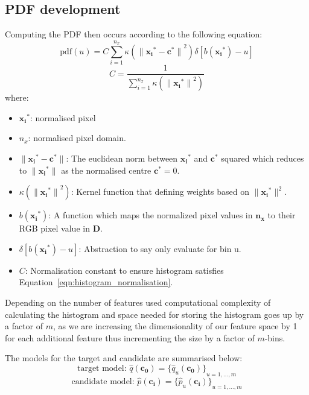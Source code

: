 \subsection{PDF development}
Computing the PDF then occurs according to the following equation:
\begin{equation}\label{eqn:mean_shift_histogram}
    \text{pdf}(u)=C\sum_{i=1}^{n_x}\kappa({\parallel{\mathbf{x_i}^*}-{\mathbf{c}^*}\parallel}^2)\delta[b(\mathbf{x_i}^*)-u]    
\end{equation}
\begin{equation}\label{eqn:histogram_normalisation}
    C=\frac{1}{\sum_{i=1}^{n_x}\kappa({\parallel\mathbf{x_i}^*\parallel}^2)}
\end{equation}
where:
\begin{itemize}
    \item $\mathbf{x_i}^*$: normalised pixel 
    \item $n_x$: normalised pixel domain.
    \item $\parallel{\mathbf{x_i}}^*-{\mathbf{c}}^*\parallel$: The euclidean
        norm between $\mathbf{x_i}^*$ and ${\mathbf{c}}^*$ squared which
        reduces to $\parallel{\mathbf{x_i}}^*\parallel$ as the normalised centre
        $\mathbf{c}^* = 0$. 
    \item $\kappa({\parallel{\mathbf{x_i}}^*\parallel}^2)$: Kernel function that
        defining weights based on $\parallel{\mathbf{x_i}}^*\parallel^2$.
    \item $b({\mathbf{x_i}}^*)$: A function which maps the normalized pixel
        values in $\mathbf{n_x}$ to their RGB pixel value in $\mathbf{D}$.
    \item $\delta[b({\mathbf{x_i}}^*)-u]$: Abstraction to say only evaluate for bin u.
    \item $C$: Normalisation constant to ensure histogram satisfies Equation~\ref{eqn:histogram_normalisation}.
\end{itemize}

Depending on the number of features used computational complexity of calculating
the histogram and space needed for storing the histogram goes up by a factor of
$m$, as we are increasing the dimensionality of our feature space by 1 for each
additional feature thus incrementing the size by a factor of $m$-bins.

The models for the target and candidate are summarised below:
\[\text{target model: }  \hat{q}(\mathbf{c_0}) = {\{\hat{q}_u(\mathbf{c_0})\}}_{u=1,\ldots,m}\]
\[\text{candidate model: }  \hat{p}(\mathbf{c_i}) = {\{\hat{p}_u(\mathbf{c_i})\}}_{u=1,\ldots,m}\]

